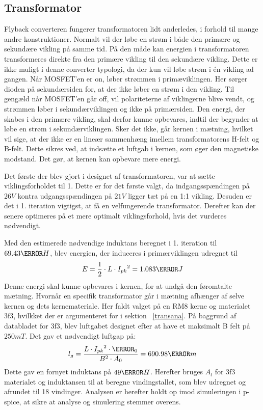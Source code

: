 \subsection{Transformator}
Flyback converteren fungerer transformatoren lidt anderledes, i forhold til mange andre konstruktioner. Normalt vil der løbe en strøm i både den primære og sekundære vikling på samme tid. På den måde kan energien i transformatoren transformeres direkte fra den primære vikling til den sekundære vikling. Dette er ikke muligt i denne converter typologi, da der kun vil løbe strøm i én vikling ad gangen. Når MOSFET'en er on, løber strømmen i primæviklingen. Her sørger dioden på sekundærsiden for, at der ikke løber en strøm i den vikling. Til gengæld når MOSFET'en går off, vil polariteterne af viklingerne blive vendt, og strømmen løber i sekundærviklingen og ikke på primærsiden. 
Den energi, der skabes i den primære vikling, skal derfor kunne opbevares, indtil der begynder at løbe en strøm i sekundærviklingen. Sker det ikke, går kernen i mætning, hvilket vil sige, at der ikke er en lineær sammenhæng imellem transformatorens H-felt og B-felt.
Dette sikres ved, at indsætte et luftgab i kernen, som øger den magnetiske modstand. Det gør, at kernen kan opbevare mere energi.

Det første der blev gjort i designet af transformatoren, var at sætte viklingsforholdet til 1. Dette er for det første valgt, da indgangsspændingen på $26V$ kontra udgangsspændingen på $21V$ ligger tæt på en 1:1 vikling. Desuden er det i 1. iteration vigtigst, at få en velfungerende transformator. Derefter kan der senere optimeres på et mere optimalt viklingsforhold, hvis det vurderes nødvendigt. 

Med den estimerede nødvendige induktans beregnet i 1. iteration til $69.43\micro H$, blev energien, der induceres i primærviklingen udregnet til \begin{equation} \label{Primary_energy}
E = \frac{1} {2} \cdot L \cdot {I_{pk}}^2 = 1.083\milli J
\end{equation}
Denne energi skal kunne opbevares i kernen, for at undgå den føromtalte mætning. Hvornår en specifik transformator går i mætning afhænger af selve kernen og dets kernemateriale. Her faldt valget på en RM8 kerne og materialet 3f3, hvilkket der er argumenteret for i sektion ~\ref{transana}.
På baggrund af databladet for 3f3, blev luftgabet designet efter at have et maksimalt B felt på $250mT$. Det gav et nødvendigt luftgap på:
\begin{equation} \label{Airgap}
l_g = \frac{L \cdot {I_{pk}}^2 \cdot \micro_0}{B^2 \cdot A_0} = 690.98\micro m
\end{equation}
 Dette gav en fornyet induktans på $49\micro H$. Herefter bruges $A_l$ for 3f3 materialet og induktansen til at beregne vindingstallet, som blev udregnet og afrundet til 18 vindinger.
 Analysen er herefter holdt op imod simuleringen i p-spice, at sikre at analyse og simulering stemmer overens.
 
